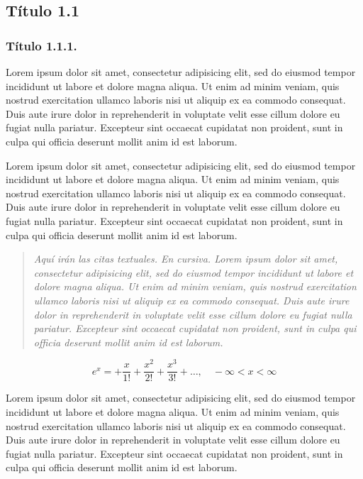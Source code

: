 \documentclass[a4paper,10pt,twoside]{article}
\begin{document}
\subsection{Título 1.1}
\subsubsection{Título 1.1.1.}
Lorem ipsum dolor sit amet, consectetur adipisicing elit, sed do eiusmod tempor incididunt ut labore 
et dolore magna aliqua. Ut enim ad minim veniam, quis nostrud exercitation ullamco laboris nisi ut 
aliquip ex ea commodo consequat. Duis aute irure dolor in reprehenderit in voluptate velit esse cillum 
dolore eu fugiat nulla pariatur. Excepteur sint occaecat cupidatat non proident, sunt in culpa qui 
officia deserunt mollit anim id est laborum. 

Lorem ipsum dolor sit amet, consectetur adipisicing elit, sed do eiusmod tempor incididunt ut labore 
et dolore magna aliqua. Ut enim ad minim veniam, quis nostrud exercitation ullamco laboris nisi ut 
aliquip ex ea commodo consequat. Duis aute irure dolor in reprehenderit in voluptate velit esse cillum 
dolore eu fugiat nulla pariatur. Excepteur sint occaecat cupidatat non proident, sunt in culpa qui 
officia deserunt mollit anim id est laborum. 

\begin{quote}
\emph{Aquí irán las citas textuales. En cursiva. Lorem ipsum dolor sit amet, consectetur adipisicing elit, sed do eiusmod tempor incididunt ut labore et dolore magna aliqua. Ut enim ad minim veniam, quis nostrud exercitation ullamco laboris nisi ut 
aliquip ex ea commodo consequat. Duis aute irure dolor in reprehenderit in voluptate velit esse cillum dolore eu fugiat nulla pariatur. Excepteur sint occaecat cupidatat non proident, sunt in culpa qui officia deserunt mollit anim id est laborum.}
\end{quote}

$$e^x=+\frac{x}{1!}+\frac{x^2}{2!}+\frac{x^3}{3!}+\ldots,\quad -\infty<x<\infty$$

Lorem ipsum dolor sit amet, consectetur adipisicing elit, sed do eiusmod tempor incididunt ut labore 
et dolore magna aliqua. Ut enim ad minim veniam, quis nostrud exercitation ullamco laboris nisi ut 
aliquip ex ea commodo consequat. Duis aute irure dolor in reprehenderit in voluptate velit esse cillum 
dolore eu fugiat nulla pariatur. Excepteur sint occaecat cupidatat non proident, sunt in culpa qui 
officia deserunt mollit anim id est laborum.
\end{document}
